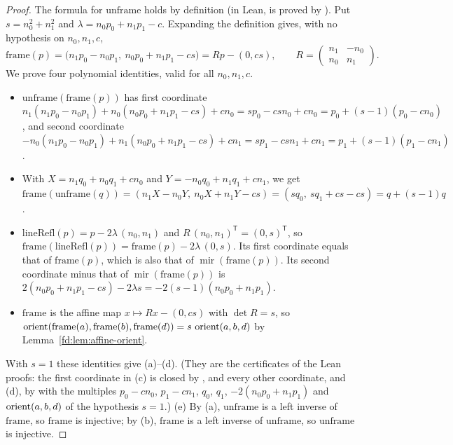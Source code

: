 \begin{proof}
The formula for $\mathrm{unframe}$ holds by definition (in Lean,  is proved by
). Put $s=n_0^2+n_1^2$ and $\lambda=n_0p_0+n_1p_1-c$. Expanding the
definition gives, with no hypothesis on $n_0,n_1,c$,
\[ \mathrm{frame}(p)=\bigl(n_1p_0-n_0p_1,\ n_0p_0+n_1p_1-cs\bigr)=Rp-(0,cs),\qquad
   R=\begin{pmatrix}n_1&-n_0\\ n_0&n_1\end{pmatrix}. \]
We prove four polynomial identities, valid for all $n_0,n_1,c$.
\begin{itemize}
\item $\mathrm{unframe}(\mathrm{frame}(p))$ has first coordinate
  $n_1(n_1p_0-n_0p_1)+n_0(n_0p_0+n_1p_1-cs)+cn_0=sp_0-csn_0+cn_0=p_0+(s-1)(p_0-cn_0)$, and second coordinate
  $-n_0(n_1p_0-n_0p_1)+n_1(n_0p_0+n_1p_1-cs)+cn_1=sp_1-csn_1+cn_1=p_1+(s-1)(p_1-cn_1)$.
\item With $X=n_1q_0+n_0q_1+cn_0$ and $Y=-n_0q_0+n_1q_1+cn_1$, we get
  $\mathrm{frame}(\mathrm{unframe}(q))=(n_1X-n_0Y,\ n_0X+n_1Y-cs)=(sq_0,\ sq_1+cs-cs)=q+(s-1)q$.
\item $\mathrm{lineRefl}(p)=p-2\lambda\,(n_0,n_1)$ and $R\,(n_0,n_1)^{\mathsf T}=(0,s)^{\mathsf T}$, so
  $\mathrm{frame}(\mathrm{lineRefl}(p))=\mathrm{frame}(p)-2\lambda\,(0,s)$. Its first coordinate equals that
  of $\mathrm{frame}(p)$, which is also that of $\operatorname{mir}(\mathrm{frame}(p))$. Its second
  coordinate minus that of $\operatorname{mir}(\mathrm{frame}(p))$ is
  $2(n_0p_0+n_1p_1-cs)-2\lambda s=-2(s-1)(n_0p_0+n_1p_1)$.
\item $\mathrm{frame}$ is the affine map $x\mapsto Rx-(0,cs)$ with $\det R=s$, so
  $\operatorname{orient}(\mathrm{frame}(a),\mathrm{frame}(b),\mathrm{frame}(d))=s\,\operatorname{orient}(a,b,d)$ by
  Lemma~\ref{fd:lem:affine-orient}.
\end{itemize}
With $s=1$ these identities give (a)--(d). (They are the certificates of the Lean proofs: the first
coordinate in (c) is closed by , and every other coordinate, and (d), by
 with the multiples $p_0-cn_0$, $p_1-cn_1$, $q_0$, $q_1$, $-2(n_0p_0+n_1p_1)$ and
$\operatorname{orient}(a,b,d)$ of the hypothesis $s=1$.)
(e) By (a), $\mathrm{unframe}$ is a left inverse of $\mathrm{frame}$, so $\mathrm{frame}$ is injective; by
(b), $\mathrm{frame}$ is a left inverse of $\mathrm{unframe}$, so $\mathrm{unframe}$ is injective.
\end{proof}


